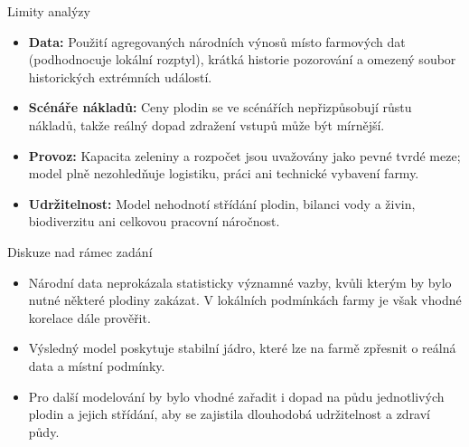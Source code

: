 \documentclass[11pt]{beamer}
\begin{document}
\begin{frame}{Limity analýzy}
  \begin{itemize}
    \item \textbf{Data:} Použití agregovaných národních výnosů místo farmových dat (podhodnocuje lokální rozptyl), krátká historie pozorování a omezený soubor historických extrémních událostí.
    
    \vspace{0.25cm}
    \item \textbf{Scénáře nákladů:} Ceny plodin se ve scénářích nepřizpůsobují růstu nákladů, takže reálný dopad zdražení vstupů může být mírnější.
    
    \vspace{0.25cm}
    \item \textbf{Provoz:} Kapacita zeleniny a rozpočet jsou uvažovány jako pevné tvrdé meze; model plně nezohledňuje logistiku, práci ani technické vybavení farmy.
    
    \vspace{0.25cm}
    \item \textbf{Udržitelnost:} Model nehodnotí střídání plodin, bilanci vody a živin, biodiverzitu ani celkovou pracovní náročnost.
  \end{itemize}
\end{frame}

\begin{frame}{Diskuze nad rámec zadání}
  \begin{itemize}
    \item Národní data neprokázala statisticky významné vazby, kvůli kterým by bylo nutné některé plodiny zakázat. V lokálních podmínkách farmy je však vhodné korelace dále prověřit.
    \vspace{0.35cm}
    \item Výsledný model poskytuje stabilní jádro, které lze na farmě zpřesnit o reálná data a místní podmínky.
    \vspace{0.35cm}
    \item Pro další modelování by bylo vhodné zařadit i dopad na půdu jednotlivých plodin a jejich střídání, aby se zajistila dlouhodobá udržitelnost a zdraví půdy.
  \end{itemize}
\end{frame}
\end{document}
